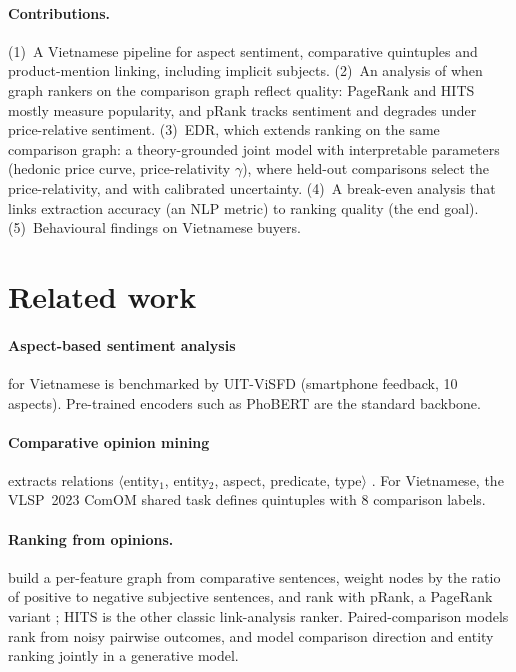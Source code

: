 \documentclass{article}
\begin{document}
\paragraph{Contributions.}
(1)~A Vietnamese pipeline for aspect sentiment, comparative quintuples and product-mention linking, including implicit subjects.
(2)~An analysis of when graph rankers on the comparison graph reflect quality: PageRank and HITS mostly measure popularity, and pRank
\citep{zhang2010} tracks sentiment and degrades under price-relative sentiment.
(3)~EDR, which extends ranking on the same comparison graph: a theory-grounded joint model with interpretable parameters (hedonic price curve, price-relativity $\gamma$), where held-out comparisons select
the price-relativity, and with calibrated uncertainty.
(4)~A break-even analysis that links extraction accuracy (an NLP metric) to ranking quality (the end goal).
(5)~Behavioural findings on Vietnamese buyers.

\section{Related work}
\paragraph{Aspect-based sentiment analysis} for Vietnamese is benchmarked by UIT-ViSFD \citep{visfd} (smartphone feedback, 10 aspects).
Pre-trained encoders such as PhoBERT \citep{phobert} are the standard backbone.
\paragraph{Comparative opinion mining} extracts relations $\langle$entity$_1$, entity$_2$, aspect, predicate, type$\rangle$ \citep{jindal2006}.
For Vietnamese, the VLSP~2023 ComOM shared task \citep{vcom} defines quintuples with 8 comparison labels.
\paragraph{Ranking from opinions.} \citet{zhang2010} build a per-feature graph from comparative sentences, weight nodes by the ratio of positive to negative
subjective sentences, and rank with pRank, a PageRank variant \citep{pagerank}; HITS \citep{hits} is the other classic link-analysis ranker. Paired-comparison models \citep{bt1952} rank from noisy pairwise outcomes, and \citet{tkachenko2014} model comparison direction and
entity ranking jointly in a generative model.
\end{document}

